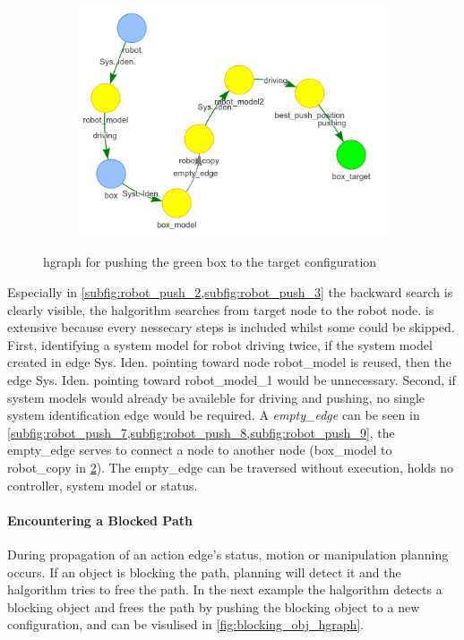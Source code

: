 \begin{figure}[H]
\begin{subfigure}{.3\textwidth}
    \includegraphics[width=1.05\textwidth]{figures/connecting_nodes/robot_push/robot_push_9}
    \caption{}\label{subfig:robot_push_9}
    \end{subfigure}
    \caption{\ac{hgraph} for pushing the green box to the target configuration}%
    \label{fig:robot_push_hgraph}
\end{figure}
Especially in \cref{subfig:robot_push_2,subfig:robot_push_3} the backward search is clearly visible, the \ac{halgorithm} searches from target node to the robot node.  is extensive because every nessecary steps is included whilst some could be skipped. First, identifying a system model for robot driving twice, if the system model created in edge Sys. Iden. pointing toward node robot\_model is reused, then the edge Sys. Iden. pointing toward robot\_model\_1 would be unnecessary. Second, if system models would already be availeble for driving and pushing, no single system identification edge would be required. A \textit{empty\_edge} can be seen in \cref{subfig:robot_push_7,subfig:robot_push_8,subfig:robot_push_9}, the empty\_edge serves to connect a node to another node (box\_model to robot\_copy in \cref{fig:robot_push_hgraph}). The empty\_edge can be traversed without execution, holds no controller, system model or status.\bs

\paragraph{Encountering a Blocked Path}%
During propagation of an action edge's status, motion or manipulation planning occurs. If an object is blocking the path, planning will detect it and the \ac{halgorithm} tries to free the path. In the next example the \ac{halgorithm} detects a blocking object and frees the path by pushing the blocking object to a new configuration, and can be visulised in \cref{fig:blocking_obj_hgraph}.\bs


